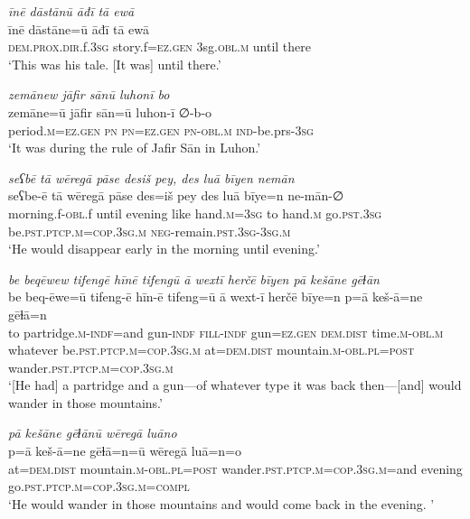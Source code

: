 \ea \label{BP.212}
\textit{īnē dāstānū āđī tā ewā} \\ 
\gll īnē dāstāne=ū āđī tā ewā \\ 
 \textsc{dem.prox}\textsc{.dir}.f\textsc{.3sg} story.f\textsc{=ez.gen} 3sg\textsc{.obl}\textsc{.m} until there \\ 
\glt `This was his tale. [It was] until there.'
\z 
 

\ea \label{ŠJ.1}
\textit{zemānew jāfir sānū luhonī bo} \\ 
\gll zemāne=ū jāfir sān=ū luhon-ī ∅-b-o \\ 
 period\textsc{.m}\textsc{=ez.gen} \textsc{pn} \textsc{pn}\textsc{=ez.gen} \textsc{pn}\textsc{-obl}\textsc{.m} \textsc{ind-}be.prs\textsc{-3sg} \\ 
\glt `It was during the rule of Jafir Sān in Luhon.'
\z 
 
\ea \label{ŠJ.6}
\textit{seʕbē tā wēregā pāse desiš pey, des luā bīyen nemān} \\ 
\gll seʕbe-ē tā wēregā pāse des=iš pey des luā bīye=n ne-mān-∅ \\ 
 morning.f\textsc{-obl}.f until evening like hand\textsc{.m}\textsc{=3sg} to hand\textsc{.m} go\textsc{.pst}\textsc{.3sg} be\textsc{.pst}\textsc{.ptcp}\textsc{.m}\textsc{=cop}\textsc{.3sg}\textsc{.m} \textsc{neg-}remain\textsc{.pst}\textsc{.3sg}\textsc{-3sg}\textsc{.m} \\ 
\glt `He would disappear early in the morning until evening.'
\z 
 
\ea \label{ŠJ.7}
\textit{be beqēwew tifengē hīnē tifengū ā wextī herčē bīyen pā kešāne gēɫān} \\ 
\gll be beq-ēwe=ū tifeng-ē hīn-ē tifeng=ū ā wext-ī herčē bīye=n p=ā keš-ā=ne gēɫā=n \\ 
 to partridge\textsc{.m}\textsc{-indf}=and gun\textsc{-indf} \textsc{fill}\textsc{-indf} gun\textsc{=ez.gen} \textsc{dem.dist} time\textsc{.m}\textsc{-obl}\textsc{.m} whatever be\textsc{.pst}\textsc{.ptcp}\textsc{.m}\textsc{=cop}\textsc{.3sg}\textsc{.m} at=\textsc{dem.dist} mountain\textsc{.m}\textsc{-obl}\textsc{.pl}\textsc{=\textsc{post}} wander\textsc{.pst}\textsc{.ptcp}\textsc{.m}\textsc{=cop}\textsc{.3sg}\textsc{.m} \\ 
\glt `[He had] a partridge and a gun—of whatever type it was back then—[and] would wander in those mountains.'
\z 
 
\ea \label{ŠJ.8}
\textit{pā kešāne gēɫānū wēregā luāno} \\ 
\gll p=ā keš-ā=ne gēɫā=n=ū wēregā luā=n=o \\ 
 at=\textsc{dem.dist} mountain\textsc{.m}\textsc{-obl}\textsc{.pl}\textsc{=\textsc{post}} wander\textsc{.pst}\textsc{.ptcp}\textsc{.m}\textsc{=cop}\textsc{.3sg}\textsc{.m}=and evening go\textsc{.pst}\textsc{.ptcp}\textsc{.m}\textsc{=cop}\textsc{.3sg}\textsc{.m}\textsc{=compl} \\ 
\glt `He would wander in those mountains and would come back in the evening. '
\z 
 
